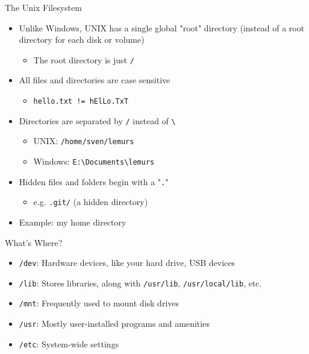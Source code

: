 \documentclass[11pt]{beamer}
\begin{document}
\begin{frame}{The Unix Filesystem}
  \begin{itemize}[<+- | alert@+>]
    \item Unlike Windows, UNIX has a single global "root" directory (instead of a root directory for each disk or volume)
    \begin{itemize}[<+- | alert@+>]
      \item The root directory is just \texttt{/}
    \end{itemize}
    \item All files and directories are case sensitive
    \begin{itemize}[<+- | alert@+>]
      \item \texttt{hello.txt != hElLo.TxT}
    \end{itemize}
    \item Directories are separated by \texttt{/} instead of \texttt{\textbackslash}
    \begin{itemize}[<+- | alert@+>]
      \item UNIX: \texttt{/home/sven/lemurs}
      \item Windows: \texttt{E:\textbackslash Documents\textbackslash lemurs}
    \end{itemize}
    \item Hidden files and folders begin with a "\texttt{.}"
    \begin{itemize}[<+- | alert@+>]
      \item e.g. \texttt{.git/} (a hidden directory)
    \end{itemize}
    \item Example: my home directory
  \end{itemize}
\end{frame}

\begin{frame}{What's Where?}
  \begin{itemize}[<+- | alert@+>]
    \item \texttt{/dev}: Hardware devices, like your hard drive, USB devices
    \item \texttt{/lib}: Stores libraries, along with \texttt{/usr/lib}, \texttt{/usr/local/lib}, etc.
    \item \texttt{/mnt}: Frequently used to mount disk drives
    \item \texttt{/usr}: Mostly user-installed programs and amenities
    \item \texttt{/etc}: System-wide settings
  \end{itemize}
\end{frame}
\end{document}
